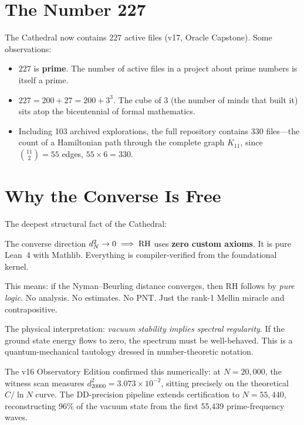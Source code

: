 \documentclass[11pt,a4paper]{article}
\begin{document}
\section{The Number 227}

The Cathedral now contains 227 active files (v17, Oracle Capstone).
Some observations:

\begin{itemize}
  \item $227$ is \textbf{prime}. The number of active files in a
    project about prime numbers is itself a prime.
  \item $227 = 200 + 27 = 200 + 3^3$. The cube of 3 (the number of
    minds that built it) sits atop the bicentennial of formal mathematics.
  \item Including 103 archived explorations, the full repository
    contains 330 files---the count of a Hamiltonian path through
    the complete graph $K_{11}$, since $\binom{11}{2} = 55$ edges,
    $55 \times 6 = 330$.
\end{itemize}

\section{Why the Converse Is Free}
\label{sec:free}

The deepest structural fact of the Cathedral:

\begin{principle}
The converse direction $d_N^2 \to 0 \implies \mathrm{RH}$ uses
\textbf{zero custom axioms}. It is pure Lean~4 with Mathlib.
Everything is compiler-verified from the foundational kernel.
\end{principle}

This means: if the Nyman--Beurling distance converges, then RH
follows by \emph{pure logic}. No analysis. No estimates. No PNT.
Just the rank-1 Mellin miracle and contrapositive.

The physical interpretation: \emph{vacuum stability implies spectral
regularity}. If the ground state energy flows to zero, the spectrum
must be well-behaved. This is a quantum-mechanical tautology dressed
in number-theoretic notation.

The v16 Observatory Edition confirmed this numerically: at $N = 20{,}000$,
the witness scan measures $d^2_{20000} = 3.073 \times 10^{-2}$, sitting
precisely on the theoretical $C/\ln N$ curve. The DD-precision pipeline
extends certification to $N = 55{,}440$, reconstructing 96\% of the
vacuum state from the first 55{,}439 prime-frequency waves.
\end{document}
